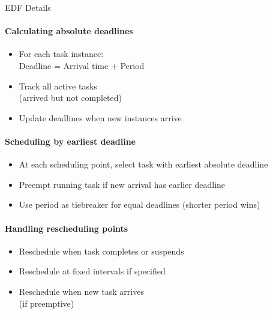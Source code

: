 \begin{minipage}{0.46\linewidth}
\begin{theorem}{EDF Details}
    \paragraph{Calculating absolute deadlines}
    \begin{itemize}
        \item For each task instance:\\ Deadline = Arrival time + Period
        \item Track all active tasks \\ (arrived but not completed)
        \item Update deadlines when new instances arrive
    \end{itemize}
    
    \paragraph{Scheduling by earliest deadline}
    \begin{itemize}
        \item At each scheduling point, select task with earliest absolute deadline
        \item Preempt running task if new arrival has earlier deadline
        \item Use period as tiebreaker for equal deadlines (shorter period wins)
    \end{itemize}
    
    \paragraph{Handling rescheduling points}
    \begin{itemize}
        \item Reschedule when task completes or suspends
        \item Reschedule at fixed intervals if specified
        \item Reschedule when new task arrives \\ (if preemptive)
    \end{itemize}
\end{theorem}
\end{minipage}


